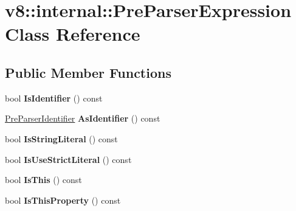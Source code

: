 \hypertarget{classv8_1_1internal_1_1_pre_parser_expression}{}\section{v8\+:\+:internal\+:\+:Pre\+Parser\+Expression Class Reference}
\label{classv8_1_1internal_1_1_pre_parser_expression}
\subsection*{Public Member Functions}
\begin{DoxyCompactItemize}
\item 
\hypertarget{classv8_1_1internal_1_1_pre_parser_expression_a0c51f840c77b23a1f6539266e52dc3c6}{}bool {\bfseries Is\+Identifier} () const \label{classv8_1_1internal_1_1_pre_parser_expression_a0c51f840c77b23a1f6539266e52dc3c6}

\item 
\hypertarget{classv8_1_1internal_1_1_pre_parser_expression_a63b4713763ad9fe4a4c63b190bad3075}{}\hyperlink{classv8_1_1internal_1_1_pre_parser_identifier}{Pre\+Parser\+Identifier} {\bfseries As\+Identifier} () const \label{classv8_1_1internal_1_1_pre_parser_expression_a63b4713763ad9fe4a4c63b190bad3075}

\item 
\hypertarget{classv8_1_1internal_1_1_pre_parser_expression_af6e232477723ff00c7150706d7a1dbc2}{}bool {\bfseries Is\+String\+Literal} () const \label{classv8_1_1internal_1_1_pre_parser_expression_af6e232477723ff00c7150706d7a1dbc2}

\item 
\hypertarget{classv8_1_1internal_1_1_pre_parser_expression_acf59242c78bcf6a988bee3d44b5261d2}{}bool {\bfseries Is\+Use\+Strict\+Literal} () const \label{classv8_1_1internal_1_1_pre_parser_expression_acf59242c78bcf6a988bee3d44b5261d2}

\item 
\hypertarget{classv8_1_1internal_1_1_pre_parser_expression_a9df4e7fc0198a7d6c47873fc00101047}{}bool {\bfseries Is\+This} () const \label{classv8_1_1internal_1_1_pre_parser_expression_a9df4e7fc0198a7d6c47873fc00101047}

\item 
\hypertarget{classv8_1_1internal_1_1_pre_parser_expression_ad93dca08dbf4f594091ac51c938e854b}{}bool {\bfseries Is\+This\+Property} () const \label{classv8_1_1internal_1_1_pre_parser_expression_ad93dca08dbf4f594091ac51c938e854b}


\end{DoxyCompactItemize}
